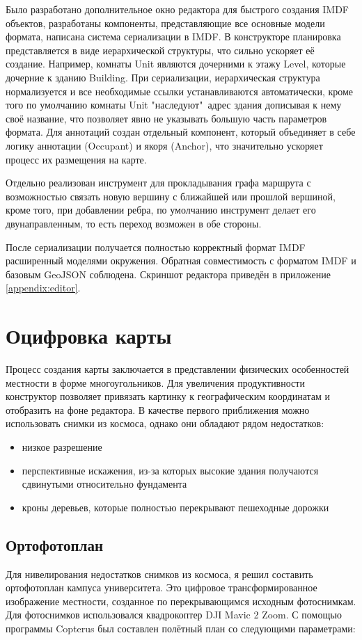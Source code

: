     Было разработано дополнительное окно редактора для быстрого создания IMDF объектов, разработаны компоненты, представляющие все основные модели формата, написана система сериализации в IMDF. В конструкторе планировка представляется в виде иерархической структуры, что сильно ускоряет её создание. Например, комнаты Unit являются дочерними к этажу Level, которые дочерние к зданию Building. При сериализации, иерархическая структура нормализуется и все необходимые ссылки устанавливаются автоматически, кроме того по умолчанию комнаты Unit "наследуют"\ адрес здания дописывая к нему своё название, что позволяет явно не указывать большую часть параметров формата. Для аннотаций создан отдельный компонент, который объединяет в себе логику аннотации (Occupant) и якоря (Anchor), что значительно ускоряет процесс их размещения на карте.

    Отдельно реализован инструмент для прокладывания графа маршрута с возможностью связать новую вершину с ближайшей или прошлой вершиной, кроме того, при добавлении ребра, по умолчанию инструмент делает его двунаправленным, то есть переход возможен в обе стороны.

    После сериализации получается полностью корректный формат IMDF расширенный моделями окружения. Обратная совместимость с форматом IMDF и базовым GeoJSON соблюдена. Скриншот редактора приведён в приложение \ref{appendix:editor}.

  \section{Оцифровка карты}
    Процесс создания карты заключается в представлении физических особенностей местности в форме многоугольников. Для увеличения продуктивности конструктор позволяет привязать картинку к географическим координатам и отобразить на фоне редактора. В качестве первого приближения можно использовать снимки из космоса, однако они обладают рядом недостатков:
    \begin{itemize}
      \item низкое разрешение
      \item перспективные искажения, из-за которых высокие здания получаются сдвинутыми относительно фундамента
      \item кроны деревьев, которые полностью перекрывают пешеходные дорожки
    \end{itemize}

    \subsection{Ортофотоплан}
      Для нивелирования недостатков снимков из космоса, я решил составить ортофотоплан кампуса университета. Это цифровое трансформированное изображение местности, созданное по перекрывающимся исходным фотоснимкам. Для фотоснимков использовался квадрокоптер DJI Mavic 2 Zoom.
      С помощью программы Copterus \cite{Copterus} был составлен полётный план со следующими параметрами:

